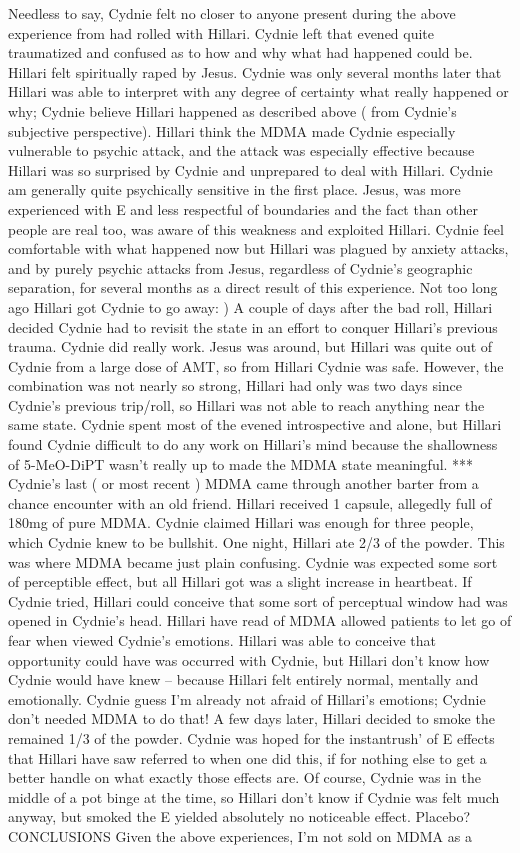 \documentclass[12pt]{book}
\begin{document}
Needless to say, Cydnie felt no closer to anyone present during the above experience from had rolled with Hillari. Cydnie left that evened quite traumatized and confused as to how and why what had happened could be. Hillari felt spiritually raped by Jesus. Cydnie was only several months later that Hillari was able to interpret with any degree of certainty what really happened or why; Cydnie believe Hillari happened as described above ( from Cydnie's subjective perspective). Hillari think the MDMA made Cydnie especially vulnerable to psychic attack, and the attack was especially effective because Hillari was so surprised by Cydnie and unprepared to deal with Hillari. Cydnie am generally quite psychically sensitive in the first place. Jesus, was more experienced with E and less respectful of boundaries and the fact than other people are real too, was aware of this weakness and exploited Hillari. Cydnie feel comfortable with what happened now but Hillari was plagued by anxiety attacks, and by purely psychic attacks from Jesus, regardless of Cydnie's geographic separation, for several months as a direct result of this experience. Not too long ago Hillari got Cydnie to go away: ) A couple of days after the bad roll, Hillari decided Cydnie had to revisit the state in an effort to conquer Hillari's previous trauma. Cydnie did really work. Jesus was around, but Hillari was quite out of Cydnie from a large dose of AMT, so from Hillari Cydnie was safe. However, the combination was not nearly so strong, Hillari had only was two days since Cydnie's previous trip/roll, so Hillari was not able to reach anything near the same state. Cydnie spent most of the evened introspective and alone, but Hillari found Cydnie difficult to do any work on Hillari's mind because the shallowness of 5-MeO-DiPT wasn't really up to made the MDMA state meaningful. *** Cydnie's last ( or most recent ) MDMA came through another barter from a chance encounter with an old friend. Hillari received 1 capsule, allegedly full of 180mg of pure MDMA. Cydnie claimed Hillari was enough for three people, which Cydnie knew to be bullshit. One night, Hillari ate 2/3 of the powder. This was where MDMA became just plain confusing. Cydnie was expected some sort of perceptible effect, but all Hillari got was a slight increase in heartbeat. If Cydnie tried, Hillari could conceive that some sort of perceptual window had was opened in Cydnie's head. Hillari have read of MDMA allowed patients to let go of fear when viewed Cydnie's emotions. Hillari was able to conceive that opportunity could have was occurred with Cydnie, but Hillari don't know how Cydnie would have knew -- because Hillari felt entirely normal, mentally and emotionally. Cydnie guess I'm already not afraid of Hillari's emotions; Cydnie don't needed MDMA to do that! A few days later, Hillari decided to smoke the remained 1/3 of the powder. Cydnie was hoped for the instantrush' of E effects that Hillari have saw referred to when one did this, if for nothing else to get a better handle on what exactly those effects are. Of course, Cydnie was in the middle of a pot binge at the time, so Hillari don't know if Cydnie was felt much anyway, but smoked the E yielded absolutely no noticeable effect. Placebo? CONCLUSIONS Given the above experiences, I'm not sold on MDMA as a 
\end{document}
